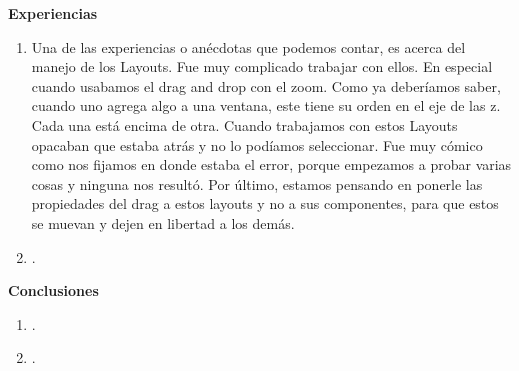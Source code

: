 \documentclass[12pt]{report}
\begin{document}
	\vspace{4em}
	
	\begingroup
		\large{
			\textbf{
				Experiencias
				\newline
				\newline
			}
		}
	\endgroup

		\begin{enumerate}[--]%
		\item Una de las experiencias o anécdotas que podemos contar, es acerca del manejo de los Layouts. Fue muy complicado trabajar con ellos. En especial cuando usabamos el drag and drop con el zoom. 
\newline Como ya deberíamos saber, cuando uno agrega algo a una ventana, este tiene su orden en el eje de las z. Cada una está encima de otra. Cuando trabajamos con estos Layouts opacaban que estaba atrás y no lo podíamos seleccionar. Fue muy cómico como nos fijamos en donde estaba el error, porque empezamos a probar varias cosas y ninguna nos resultó.
Por último, estamos pensando en ponerle las propiedades del drag a estos layouts y no a sus componentes, para que estos se muevan y dejen en libertad a los demás.
		\item .
		\end{enumerate}


	\vspace{4em}
	
	\begingroup
		\large{
			\textbf{
				Conclusiones
				\newline
				\newline
			}
		}
	\endgroup

		\begin{enumerate}[1]%
		\item .
		\item .
		\end{enumerate}


	
\end{document}
